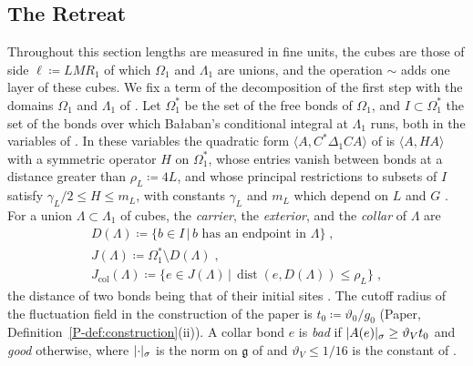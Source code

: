 \documentclass[11pt]{preprint}
\newcommand{\dist}{\operatorname{dist}}
\DeclarePairedDelimiter{\abs}{\lvert}{\rvert}
\numberwithin{equation}{section}
\theoremstyle{definition}
\theoremstyle{remark}
\theoremstyle{plain}
\begin{document}
\subsection{The Retreat}\label{sec:retreat}

Throughout this section lengths are measured in fine units, the cubes are those of side $\ell \coloneqq LMR_1$ of which $\Omega_1$ and $\Lambda_1$ are unions, and the operation $\sim$ adds one layer of these cubes. We fix a term of the decomposition of the first step with the domains $\Omega_1$ and $\Lambda_1$ of \cite[(1.10), p.~248; (1.20), p.~251]{BalabanCRE}. Let $\Omega_1^*$ be the set of the free bonds of $\Omega_1$, and $I \subset \Omega_1^*$ the set of the bonds over which Ba{\l}aban's conditional integral at $\Lambda_1$ runs, both in the variables of \cite[Section~3]{WilsonFirstStep}. In these variables the quadratic form $\langle A, C^*\Delta_1CA\rangle$ of \cite[(1.15), p.~249]{BalabanCRE} is $\langle A, HA\rangle$ with a symmetric operator $H$ on $\Omega_1^*$, whose entries vanish between bonds at a distance greater than $\rho_L \coloneqq 4L$, and whose principal restrictions to subsets of $I$ satisfy $\gamma_L/2 \leq H \leq m_L$, with constants $\gamma_L$ and $m_L$ which depend on $L$ and $G$ \cite[Section~9.1, (I1)--(I3)]{WilsonFirstStep}. For a union $\Lambda \subset \Lambda_1$ of cubes, the \emph{carrier}, the \emph{exterior}, and the \emph{collar} of $\Lambda$ are
\begin{equation}\label{eq:carrier}
    \begin{gathered}
        D(\Lambda) \coloneqq \{ b \in I \,|\, b \text{ has an endpoint in } \Lambda \}\;,
        \\
        J(\Lambda) \coloneqq \Omega_1^* \setminus D(\Lambda)\;,
        \\
        J_{\mathrm{col}}(\Lambda) \coloneqq \{ e \in J(\Lambda) \,|\, \dist(e, D(\Lambda)) \leq \rho_L \}\;,
    \end{gathered}
\end{equation}
the distance of two bonds being that of their initial sites \cite[Section~9.3.2]{WilsonFirstStep}. The cutoff radius of the fluctuation field in the construction of the paper is $t_0 \coloneqq \vartheta_0/g_0$ (Paper, Definition~\ref{P-def:construction}(ii)). A collar bond $e$ is \emph{bad} if $\abs{A(e)}_\sigma \geq \vartheta_Vt_0$ and \emph{good} otherwise, where $\abs{\cdot}_\sigma$ is the norm on $\mathfrak g$ of \cite[Section~9.1]{WilsonFirstStep} and $\vartheta_V \leq 1/16$ is the constant of \cite[Remark~9.3]{WilsonFirstStep}.
\end{document}
